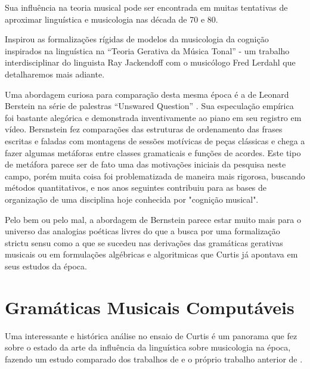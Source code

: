 \documentclass[
	12pt,				%
	openright,			%
	twoside,			%
	a4paper,			%
	english,			%
	french,				%
	spanish,			%
	brazil				%
	]{abntex2}
\begin{document}
Sua influência na teoria musical pode ser encontrada em muitas tentativas de aproximar linguística e musicologia nas década de 70 e 80.

Inspirou as formalizações rígidas de modelos da musicologia da cognição inspirados na linguística na “Teoria Gerativa da Música Tonal” \cite{lerdahl1983generative} - um trabalho interdisciplinar do linguista Ray Jackendoff com o musicólogo Fred Lerdahl que detalharemos mais adiante.

Uma abordagem curiosa para comparação desta mesma época é a de Leonard Berstein na série de palestras “Unswared Question” \cite{bernstein1976unanswered}. Sua especulação empírica foi bastante alegórica e demonstrada inventivamente ao piano em seu registro em vídeo. Bersnstein fez comparações das estruturas de ordenamento das frases escritas e faladas com montagens de sessões motívicas de peças clássicas e chega a fazer algumas metáforas entre classes gramaticais e funções de acordes. Este tipo de metáfora parece ser de fato uma das motivações iniciais da pesquisa neste campo, porém muita coisa foi problematizada de maneira mais rigorosa, buscando métodos quantitativos, e nos anos seguintes contribuiu para as bases de organização de uma disciplina hoje conhecida por "cognição musical".

Pelo bem ou pelo mal, a abordagem de Bernstein parece estar muito mais para o universo das analogias poéticas livres do que a busca por uma formalização strictu sensu \cite{lerdahl2009genesis} como a que se sucedeu nas derivações das gramáticas gerativas musicais \cite{lerdahl1983generative,temperley2004cognition} ou em formulações algébricas e algoritmicas que Curtis  já apontava em seus estudos da época.

 

\section{Gramáticas Musicais Computáveis}

Uma interessante e histórica análise no ensaio de Curtis  é um panorama que fez sobre o estado da arte da influência da linguística sobre musicologia na época, fazendo um estudo comparado dos trabalhos de  e o próprio trabalho anterior de .
\end{document}
